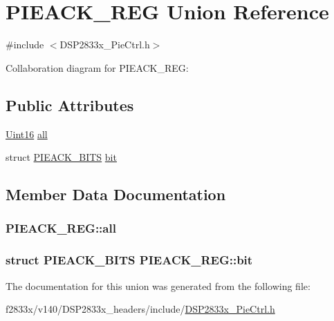 \hypertarget{union_p_i_e_a_c_k___r_e_g}{}\section{P\+I\+E\+A\+C\+K\+\_\+\+R\+E\+G Union Reference}
\label{union_p_i_e_a_c_k___r_e_g}


{\ttfamily \#include $<$D\+S\+P2833x\+\_\+\+Pie\+Ctrl.\+h$>$}



Collaboration diagram for P\+I\+E\+A\+C\+K\+\_\+\+R\+E\+G\+:
\subsection*{Public Attributes}
\begin{DoxyCompactItemize}
\item 
\hyperlink{_d_s_p2833x___device_8h_a59a9f6be4562c327cbfb4f7e8e18f08b}{Uint16} \hyperlink{union_p_i_e_a_c_k___r_e_g_a1c79f4ab1459b1cd66f5629fcdcab3df}{all}
\item 
struct \hyperlink{struct_p_i_e_a_c_k___b_i_t_s}{P\+I\+E\+A\+C\+K\+\_\+\+B\+I\+T\+S} \hyperlink{union_p_i_e_a_c_k___r_e_g_a07673b30db57f75d96d0ba1db62d57d6}{bit}
\end{DoxyCompactItemize}


\subsection{Member Data Documentation}
\hypertarget{union_p_i_e_a_c_k___r_e_g_a1c79f4ab1459b1cd66f5629fcdcab3df}{}
\subsubsection[{all}]{ P\+I\+E\+A\+C\+K\+\_\+\+R\+E\+G\+::all}\label{union_p_i_e_a_c_k___r_e_g_a1c79f4ab1459b1cd66f5629fcdcab3df}
\hypertarget{union_p_i_e_a_c_k___r_e_g_a07673b30db57f75d96d0ba1db62d57d6}{}
\subsubsection[{bit}]{\setlength{\rightskip}{0pt plus 5cm}struct {\bf P\+I\+E\+A\+C\+K\+\_\+\+B\+I\+T\+S} P\+I\+E\+A\+C\+K\+\_\+\+R\+E\+G\+::bit}\label{union_p_i_e_a_c_k___r_e_g_a07673b30db57f75d96d0ba1db62d57d6}


The documentation for this union was generated from the following file\+:\begin{DoxyCompactItemize}
\item 
f2833x/v140/\+D\+S\+P2833x\+\_\+headers/include/\hyperlink{_d_s_p2833x___pie_ctrl_8h}{D\+S\+P2833x\+\_\+\+Pie\+Ctrl.\+h}\end{DoxyCompactItemize}
